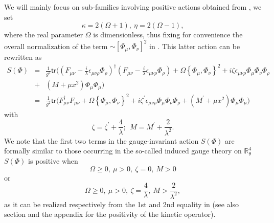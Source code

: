 \documentclass[10pt]{book}
\newcommand{\tr}{\mathsf{tr}}
\theoremstyle{break}
\begin{document}
%
We will mainly focus on sub-families involving positive actions obtained from %
, we set%
%
\begin{equation*}
\kappa= 2(\Omega+1),\ \eta= 2(\Omega-1), %
\end{equation*}
%
where the real parameter $\Omega$ is dimensionless, thus fixing for convenience the overall normalization of the term $\sim[\Phi_\mu,\Phi_\nu]^2$ in %
. This latter action can be rewritten as
\begin{eqnarray*}
S(\Phi)&=&\frac{1}{g^2} \tr\big((F_{\mu\nu} - \frac{i}{\lambda} \epsilon_{\mu\nu\rho} \Phi_\rho)^\dag (F_{\mu\nu} - \frac{i}{\lambda} \epsilon_{\mu\nu\rho} \Phi_\rho) + \Omega\left\{\Phi_\mu,\Phi_\nu\right\}^2
+i \zeta \epsilon_{\mu\nu\rho} \Phi_\mu \Phi_\nu \Phi_\rho\nonumber\\
&+& (M+\mu x^2) \Phi_\mu \Phi_\mu \big)\nonumber\\
&=&\frac{1}{g^2} \tr\big(F^\dag_{\mu\nu}F_{\mu\nu} + \Omega\left\{\Phi_\mu,\Phi_\nu\right\}^2 + i \zeta^\prime\epsilon_{\mu\nu\rho} \Phi_\mu \Phi_\nu \Phi_\rho + \left(M^\prime+\mu x^2\right) \Phi_\mu \Phi_\mu \big)%
\end{eqnarray*}
with
\begin{equation*}
\zeta = \zeta^\prime+\frac{4}{\lambda};\ \ M=M^\prime+\frac{2}{\lambda^2}. %
\end{equation*}
We note that the first two terms in the gauge-invariant action $S(\Phi)$ %
are formally similar to those occurring in the so-called induced gauge theory on $\mathbb{R}^4_\theta$ %
$S(\Phi)$ is positive when 
\begin{equation*}
\Omega\ge0,\ \mu>0,\ \zeta=0,\ M>0%
\end{equation*}
or
\begin{equation*}
\Omega\ge0,\ \mu>0,\ \zeta=\frac{4}{\lambda},\ M>\frac{2}{\lambda^2}, 
\end{equation*}
as it can be realized respectively from the 1st and 2nd equality in %
(see also section %
and the appendix for the positivity of the kinetic operator).\par
\end{document}

